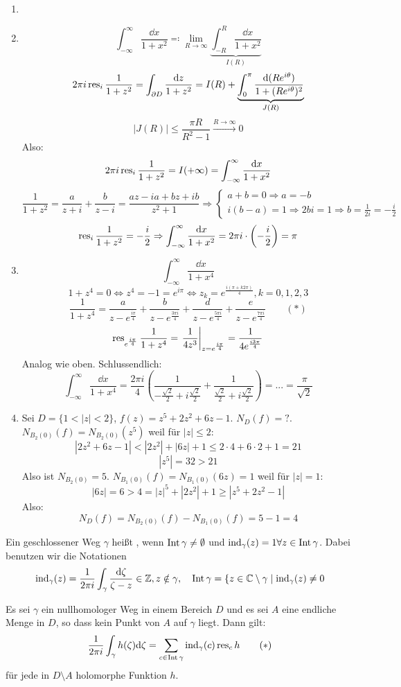 \begin{beispiel*}
	\begin{enumerate}
		\item[]
		\item \[ \int_{-\infty}^{\infty}\frac{\dd x}{1+x^2}\eqqcolon\lim_{R\to\infty}\underbrace{\int_{-R}^{R}\frac{\dd x}{1+x^2}}_{I(R)} \]
		\[ 2\pi i\operatorname{res}_i\frac{1}{1+z^2}=\int_{\partial D}^{}\frac{\mathrm d z}{1+z^2}=I(R)+\underbrace{\int_0^\pi\frac{\mathrm d(Re^{i\theta})}{1+(Re^{i\theta})^2}}_{J(R)} \]
		\[ |J(R)|\leq\frac{\pi R}{R^2-1}\xrightarrow{R\to\infty}0 \]
		Also:
		\[ 2\pi i\operatorname{res}_i\frac{1}{1+z^2}=I(+\infty)=\int_{-\infty}^{\infty}\frac{\mathrm d x}{1+x^2} \]
		\[ \frac{1}{1+z^2}=\frac{a}{z+i}+\frac{b}{z-i}=\frac{az-ia+bz+ib}{z^2+1}\Rightarrow \begin{cases}
		a+b=0\Rightarrow a=-b\\i(b-a)=1\Rightarrow 2bi=1\Rightarrow b=\frac{1}{2i}=-\frac{i}{2}
		\end{cases} \]
		\[ \operatorname{res}_i\frac{1}{1+z^2}=-\frac{i}{2}\Rightarrow\int_{-\infty}^{\infty}\frac{\mathrm d x}{1+x^2}=2\pi i\cdot\left(-\frac{i}{2}\right)=\pi \]
		\item \[ \int_{-\infty}^{\infty}\frac{\dd x}{1+x^4} \]
		\[ 1+z^4=0\Leftrightarrow z^4=-1=e^{i\pi}\Leftrightarrow z_k=e^{\frac{i(\pi+k2\pi)}{4}}, k=0,1,2,3 \]
		\[ \frac{1}{1+z^4}=\frac{a}{z-e^{\frac{i\pi}{4}}}+\frac{b}{z-e^{\frac{3\pi i}{4}}}+\frac{d}{z-e^{\frac{5\pi i}{4}}}+\frac{e}{z-e^{\frac{7\pi i}{4}}}\qquad(\ast) \]
	    \[ \operatorname{res}_{e^{\frac{i\pi }{4}}}\frac{1}{1+z^4}=\left.\frac{1}{4z^3}\right|_{z=e^{\frac{i\pi}{4}}}=\frac{1}{4e^{\frac{i3\pi}{4}}} \]
		Analog wie oben. Schlussendlich:
		\[ \int_{-\infty}^{\infty}\frac{\dd x}{1+x^4}=\frac{2\pi i}{4}\left(\frac{1}{-\frac{\sqrt{2}}{2}+i\frac{\sqrt{2}}{2}}+\frac{1}{\frac{\sqrt{2}}{2}+i\frac{\sqrt{2}}{2}}\right)=...=\frac{\pi}{\sqrt{2}} \]
		\item Sei $ D=\lbrace 1<|z|<2\rbrace $, $ f(z)=z^5+2z^2+6z-1 $. $ N_D(f)=? $.
		$ N_{B_2(0)}(f)=N_{B_2(0)}(z^5) $ weil f\"ur $ |z|\leq 2 $: \[ |2z^2+6z-1|<|2z^2|+|6z|+1\leq 2\cdot 4+6\cdot 2+1=21 \]
		\[ |z^5|=32>21 \]
		Also ist $ N_{B_2(0)}=5 $. $ N_{B_1(0)}(f)=N_{B_1(0)}(6z)=1 $ weil f\"ur $ |z|=1 $:
		\[ |6z|=6>4=|z|^5+|2z^2|+1\geq |z^5+2z^2-1| \]
		Also:
		\[ N_D(f)=N_{B_2(0)}(f)-N_{B_1(0)}(f)=5-1=4 \]
	\end{enumerate}
\end{beispiel*}
\begin{definition}
	Ein geschlossener Weg $ \gamma $ hei\ss t , wenn $ \operatorname{Int}\gamma\neq\emptyset $ und $ \operatorname{ind}_{\gamma}(z)=1\forall z\in\operatorname{Int} \gamma $. Dabei benutzen wir die Notationen
	\[ \operatorname{ind}_\gamma(z)=\frac{1}{2\pi i}\int_{\gamma}^{}\frac{\mathrm d\zeta}{\zeta-z}\in\mathbb{Z},z\notin\gamma,\quad\operatorname{Int}\gamma=\lbrace z\in\mathbb{C}\setminus\gamma\mid \operatorname{ind}_\gamma(z)\neq 0 \]
\end{definition}
\newpage
\begin{satz}[Residuensatz]
	Es sei $ \gamma $ ein nullhomologer Weg in einem Bereich $ D $ und es sei $ A $ eine endliche Menge in $ D $, so dass kein Punkt von $ A $ auf $ \gamma $ liegt. Dann gilt:
	\[ \frac{1}{2\pi i}\int_{\gamma}^{}h(\zeta)\mathrm d\zeta=\sum_{c\in\operatorname{Int}\gamma}\operatorname{ind}_\gamma(c)\operatorname{res}_c h\qquad (\ast) \]
	f\"ur jede in $ D\setminus A $ holomorphe Funktion $ h $.
\end{satz}
